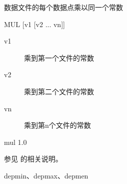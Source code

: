 \label{cmd:mul}

数据文件的每个数据点乘以同一个常数

\begin{SACSTX}
MUL [v1 [v2 ... vn]]
\end{SACSTX}

\begin{description}
\item [v1] 乘到第一个文件的常数
\item [v2] 乘到第二个文件的常数
\item [vn] 乘到第n个文件的常数
\end{description}

\begin{SACDFT}
mul 1.0
\end{SACDFT}

参见  的相关说明。

depmin、depmax、depmen
